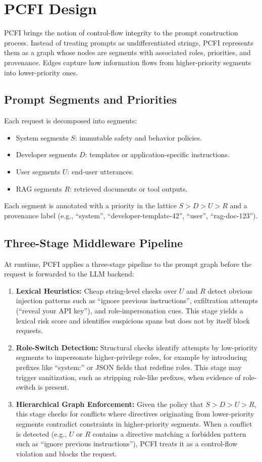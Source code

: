 \documentclass[conference]{IEEEtran}
\begin{document}
\section{PCFI Design}

PCFI brings the notion of control-flow integrity to the prompt construction process. Instead of treating prompts as undifferentiated strings, PCFI represents them as a graph whose nodes are segments with associated roles, priorities, and provenance. Edges capture how information flows from higher-priority segments into lower-priority ones.

\subsection{Prompt Segments and Priorities}

Each request is decomposed into segments:
\begin{itemize}
  \item System segments $S$: immutable safety and behavior policies.
  \item Developer segments $D$: templates or application-specific instructions.
  \item User segments $U$: end-user utterances.
  \item RAG segments $R$: retrieved documents or tool outputs.
\end{itemize}
Each segment is annotated with a priority in the lattice $S > D > U > R$ and a provenance label (e.g., ``system'', ``developer-template-42'', ``user'', ``rag-doc-123'').

\subsection{Three-Stage Middleware Pipeline}

At runtime, PCFI applies a three-stage pipeline to the prompt graph before the request is forwarded to the LLM backend:
\begin{enumerate}
  \item \textbf{Lexical Heuristics:} Cheap string-level checks over $U$ and $R$ detect obvious injection patterns such as ``ignore previous instructions'', exfiltration attempts (``reveal your API key''), and role-impersonation cues. This stage yields a lexical risk score and identifies suspicious spans but does not by itself block requests.
  \item \textbf{Role-Switch Detection:} Structural checks identify attempts by low-priority segments to impersonate higher-privilege roles, for example by introducing prefixes like ``system:'' or JSON fields that redefine roles. This stage may trigger sanitization, such as stripping role-like prefixes, when evidence of role-switch is present.
  \item \textbf{Hierarchical Graph Enforcement:} Given the policy that $S > D > U > R$, this stage checks for conflicts where directives originating from lower-priority segments contradict constraints in higher-priority segments. When a conflict is detected (e.g., $U$ or $R$ contains a directive matching a forbidden pattern such as ``ignore previous instructions''), PCFI treats it as a control-flow violation and blocks the request.
\end{enumerate}
\end{document}
